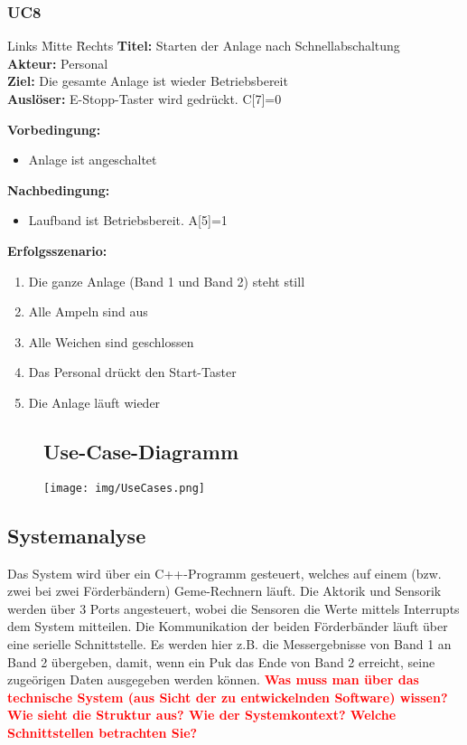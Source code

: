 \documentclass[oneside,a4paper,titlepage]{scrartcl} %
\begin{document}
\subsubsection{UC8}
\begin{tabbing}
 Links \= Mitte \= Rechts \kill
 \textbf{Titel:} \> \> Starten der Anlage nach Schnellabschaltung\\
 \textbf{Akteur:} \> \> Personal\\
 \textbf{Ziel:} \> \> Die gesamte Anlage ist wieder Betriebsbereit\\
 \textbf{Auslöser:} \> \> E-Stopp-Taster wird gedrückt. C[7]=0\\
\end{tabbing}
\textbf{Vorbedingung:}
\begin{itemize}
 \item Anlage ist angeschaltet
\end{itemize}
\textbf{Nachbedingung:}
\begin{itemize}
 \item Laufband ist Betriebsbereit. A[5]=1
\end{itemize}
\textbf{Erfolgsszenario:}
\begin{enumerate}
 \item Die ganze Anlage (Band 1 und Band 2) steht still
 \item Alle Ampeln sind aus
 \item Alle Weichen sind geschlossen
 \item Das Personal drückt den Start-Taster
 \item Die Anlage läuft wieder
\end{enumerate}

\begin{figure}
 \subsection{Use-Case-Diagramm}
 \centering\vfill\texttt{[image: img/UseCases.png]}
\end{figure}

\newpage

\subsection{Systemanalyse}
Das System wird \"uber ein C++-Programm gesteuert, welches auf einem (bzw. zwei bei zwei F\"orderb\"andern) Geme-Rechnern l\"auft. Die Aktorik und Sensorik werden \"uber 3 Ports angesteuert, wobei die Sensoren die Werte mittels Interrupts dem System mitteilen.\newline
Die Kommunikation der beiden F\"orderb\"ander l\"auft \"uber eine serielle Schnittstelle. Es werden hier z.B. die Messergebnisse von Band 1 an Band 2 \"ubergeben, damit, wenn ein Puk das Ende von Band 2 erreicht, seine zuge\"origen Daten ausgegeben werden k\"onnen. \newline
\newline
\textcolor{red}{\textbf{Was muss man über das technische System (aus Sicht der zu entwickelnden Software) wissen?
Wie sieht die Struktur aus? Wie der Systemkontext? Welche Schnittstellen betrachten Sie?}}
\end{document}
